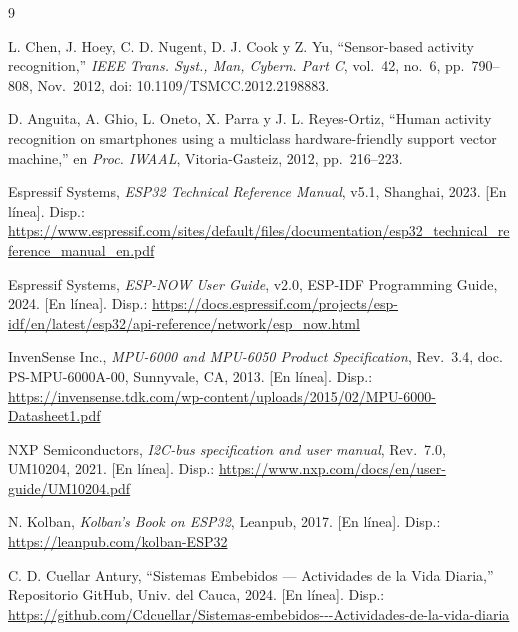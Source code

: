 \documentclass[10pt,twocolumn,a4paper]{article}
\begin{document}
\begin{thebibliography}{9}

L. Chen, J. Hoey, C. D. Nugent, D. J. Cook y Z. Yu,
``Sensor-based activity recognition,'' \textit{IEEE Trans. Syst.,
Man, Cybern. Part C}, vol.~42, no.~6, pp.~790--808, Nov.~2012,
doi: 10.1109/TSMCC.2012.2198883.

D. Anguita, A. Ghio, L. Oneto, X. Parra y J. L. Reyes-Ortiz,
``Human activity recognition on smartphones using a multiclass
hardware-friendly support vector machine,'' en \textit{Proc. IWAAL},
Vitoria-Gasteiz, 2012, pp.~216--223.

Espressif Systems, \textit{ESP32 Technical Reference Manual}, v5.1,
Shanghai, 2023. [En línea]. Disp.:
\url{https://www.espressif.com/sites/default/files/documentation/esp32_technical_reference_manual_en.pdf}

Espressif Systems, \textit{ESP-NOW User Guide}, v2.0,
ESP-IDF Programming Guide, 2024. [En línea]. Disp.:
\url{https://docs.espressif.com/projects/esp-idf/en/latest/esp32/api-reference/network/esp_now.html}

InvenSense Inc., \textit{MPU-6000 and MPU-6050 Product Specification},
Rev.~3.4, doc. PS-MPU-6000A-00, Sunnyvale, CA, 2013. [En línea]. Disp.:
\url{https://invensense.tdk.com/wp-content/uploads/2015/02/MPU-6000-Datasheet1.pdf}

NXP Semiconductors, \textit{I2C-bus specification and user manual},
Rev.~7.0, UM10204, 2021. [En línea]. Disp.:
\url{https://www.nxp.com/docs/en/user-guide/UM10204.pdf}

N. Kolban, \textit{Kolban's Book on ESP32}, Leanpub, 2017. [En línea].
Disp.: \url{https://leanpub.com/kolban-ESP32}

C. D. Cuellar Antury, ``Sistemas Embebidos — Actividades de la Vida
Diaria,'' Repositorio GitHub, Univ. del Cauca, 2024. [En línea]. Disp.:
\url{https://github.com/Cdcuellar/Sistemas-embebidos---Actividades-de-la-vida-diaria}

\end{thebibliography}
\end{document}
